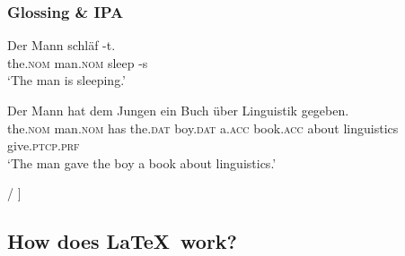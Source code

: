 {\begin{frame}
\begin{figure}
\end{figure}

\end{frame}


\begin{frame}
\frametitle{Glossing \& IPA}

\ea 
	\ea
	\gll Der Mann schläf -t.\\
	the.\textsc{nom} man.\textsc{nom} sleep -s\\
	\glt `The man is sleeping.'

	\ex 
	\gll Der Mann hat dem Jungen ein Buch über Linguistik gegeben.\\
	the.\textsc{nom} man.\textsc{nom} has the.\textsc{dat} boy.\textsc{dat} a.\textsc{acc} book.\textsc{acc} about linguistics give.\textsc{ptcp.prf}\\
	\glt `The man gave the boy a book about linguistics.' 
	\z 
		
\ex 
	\ea {} 
	\ex {/}/ 
	\ex {[}] 
	\z 
\z 

\end{frame}

}
{


}%


\subsection{How does \LaTeX\ work?}


